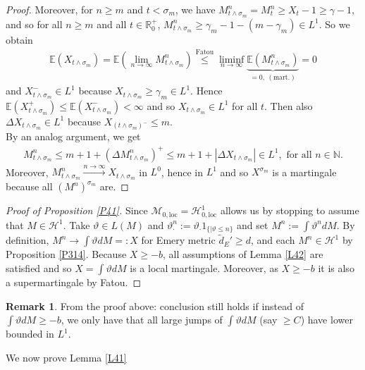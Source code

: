\documentclass[12pt,a4paper, twoside]{article}
\theoremstyle{definition}
\newtheorem{rem}{Remark}[section]
\newcommand{\EE}{\mathbb{E}} %
\begin{document}
\begin{proof}
Moreover, for $n \geq m$ and $t < \sigma_m$, we have $M_{t \wedge \sigma_m}^n = M_t^n \geq X_t-1 \geq \gamma-1$, and so for all $n \geq m$ and all $t \in \mathbb{R}_0^+$, $M_{t \wedge \sigma_m}^n \geq \gamma_m-1-(m-\gamma_m) \in L^1$. So we obtain 
\begin{align*}
\EE( X_{t \wedge \sigma_m}) = \EE( \lim_{n \to \infty} M_{t \wedge \sigma_m}^n) \overset{\text{Fatou}} \leq \liminf_{n \to \infty} \underbrace{\EE( M_{t \wedge \sigma_m}^n)}_{=0,\ (\text{mart.})}=0
\end{align*}
and $X_{t \wedge \sigma_m}^- \in L^1$ because $X_{t \wedge \sigma_m} \geq \gamma_m \in L^1$. Hence $\EE( X_{t \wedge \sigma_m}^+) \leq \EE( X_{t \wedge \sigma_m}^-) < \infty$ and so $X_{t \wedge \sigma_m} \in L^1$ for all $t$. Then also $\Delta X_{t \wedge \sigma_m} \in L^1$ because $X_{( t \wedge \sigma_m)^-} \leq m$.  \\
By an analog argument, we get 
\begin{align*}
M_{t \wedge \sigma_m}^n \leq m+1 + ( \Delta M_{t \wedge \sigma_m}^n)^+ \leq m+1 + | \Delta X_{t \wedge \sigma_m}| \in L^1, \text{ for all } n \in \mathbb{N}.
\end{align*}
Moreover, $M_{t \wedge \sigma_m}^n \xrightarrow{n \to \infty} X_{t \wedge \sigma_m}$ in $L^0$, hence in $L^1$ and so $X^{\sigma_m}$ is a martingale because all $(M^n)^{\sigma_m}$ are. 
\end{proof}
\newpage
\begin{proof}[Proof of Proposition \ref{P41}] Since $\mathcal{M}_{0, \text{loc}} = \mathcal{H}_{0, \text{loc}}^1$ allows us by stopping to assume that $M \in \mathcal{H}^1$. Take $\vartheta \in L(M)$ and $\vartheta_\cdot^n := \vartheta_\cdot 1_{\{ | \vartheta \leq n \}}$ and set $M^n:= \int \vartheta^n d M$. By definition, $M^n \to \int \vartheta dM =: X$ for Emery metric $\widetilde{d}_E' \geq d$, and each $M^n \in \mathcal{H}^1$ by Proposition \ref{P314}. Because $X \geq -b$, all assumptions of Lemma \ref{L42} are satisfied and so $X= \int \vartheta dM$ is a local martingale. Moreover, as $X \geq -b$ it is also a supermartingale by Fatou. 
\end{proof}
\begin{rem} From the proof above: conclusion still holds if instead of $\int \vartheta dM \geq -b$, we only have that all large jumps of $\int \vartheta dM$ (say $\geq C$) have lower bounded in $L^1$. 
\end{rem}
We now prove Lemma \ref{L41}
\end{document}
